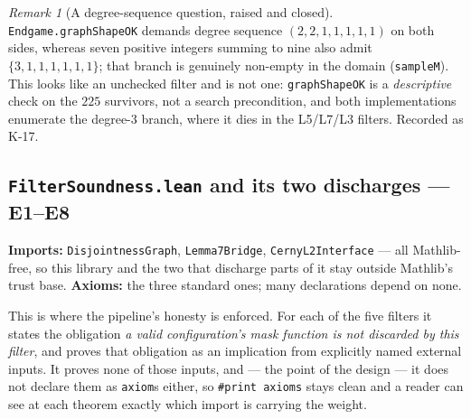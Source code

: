\documentclass[11pt,a4paper]{article}
\theoremstyle{plain}
\theoremstyle{definition}
\theoremstyle{remark}
\newtheorem*{remark}{Remark}
\begin{document}
\begin{remark}[A degree-sequence question, raised and closed]
\texttt{Endgame.graphShapeOK} demands degree sequence $(2,2,1,1,1,1,1)$ on both
sides, whereas seven positive integers summing to nine also admit
$\{3,1,1,1,1,1,1\}$; that branch is genuinely non-empty in the domain
(\texttt{sampleM}). This looks like an unchecked filter and is not one:
\texttt{graphShapeOK} is a \emph{descriptive} check on the $225$ survivors, not
a search precondition, and both implementations enumerate the degree-$3$ branch,
where it dies in the L5/L7/L3 filters. Recorded as K-17.
\end{remark}


\subsection*{\texttt{FilterSoundness.lean} and its two discharges --- \textsf{E1}--\textsf{E8}}\label{sec:leaniface}
\textbf{Imports:} \texttt{DisjointnessGraph}, \texttt{Lemma7Bridge},
\texttt{CernyL2Interface} --- all Mathlib-free, so this library and the two that
discharge parts of it stay outside Mathlib's trust base.
\textbf{Axioms:} the three standard ones; many declarations depend on none.

This is where the pipeline's honesty is enforced. For each of the five filters
it states the obligation \emph{a valid configuration's mask function is not
discarded by this filter}, and proves that obligation as an implication from
explicitly named external inputs. It proves none of those inputs, and --- the
point of the design --- it does not declare them as \texttt{axiom}s either, so
\texttt{\#print axioms} stays clean and a reader can see at each theorem exactly
which import is carrying the weight.
\end{document}
